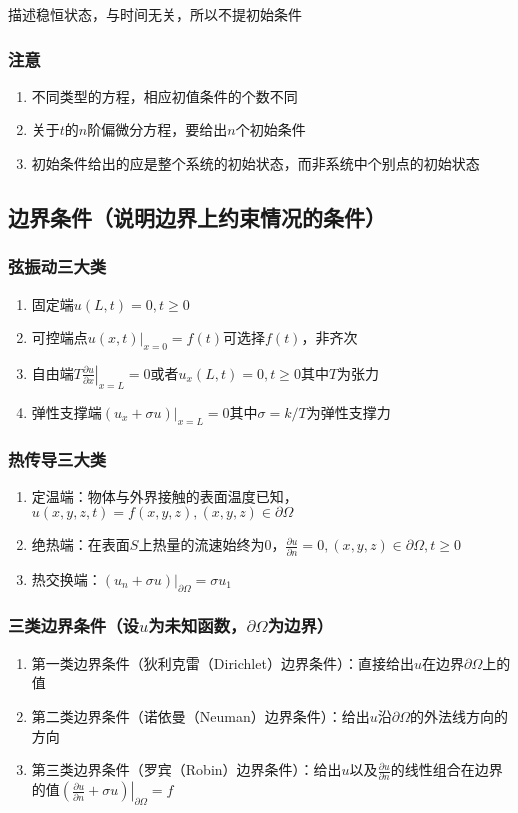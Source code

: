 描述稳恒状态，与时间无关，所以不提初始条件

\subsubsection{注意}
\begin{enumerate}
	\item 不同类型的方程，相应初值条件的个数不同
	\item 关于\(t\)的\(n\)阶偏微分方程，要给出\(n\)个初始条件
	\item 初始条件给出的应是整个系统的初始状态，而非系统中个别点的初始状态
\end{enumerate}

\subsection{边界条件（说明边界上约束情况的条件）}

\subsubsection{弦振动三大类}
\begin{enumerate}
	\item 固定端\(u\left(L,t\right)=0,t\geq0\)
	\item 可控端点\(u(x,t)|_{x=0}=f(t)\)可选择\(f(t)\)，非齐次
	\item 自由端\(T\left.\frac{\partial u}{\partial x}\right|_{x=L}=0\)或者\(u_x\left(L,t\right)=0,t\geq0\)其中\(T\)为张力
	\item 弹性支撑端\((u_x+\sigma u)|_{x=L}=0\)其中\(\sigma=k/T\)为弹性支撑力
\end{enumerate}

\subsubsection{热传导三大类}
\begin{enumerate}
	\item 定温端：物体与外界接触的表面温度已知，\(u(x,y,z,t)=f(x,y,z),(x,y,z)\in\partial\Omega\)
	\item 绝热端：在表面\(S\)上热量的流速始终为0，\(\frac{\partial u}{\partial n}=0,(x,y,z)\in\partial\Omega,t\geq0\)
	\item 热交换端：\((u_n+\sigma u)|_{\partial\Omega}=\sigma u_1\)
\end{enumerate}

\subsubsection{三类边界条件（设\(u\)为未知函数，\(\partial\Omega\)为边界）}
\begin{enumerate}
	\item 第一类边界条件（狄利克雷（Dirichlet）边界条件）：直接给出\(u\)在边界\(\partial\Omega\)上的值
	\item 第二类边界条件（诺依曼（Neuman）边界条件）：给出\(u\)沿\(\partial\Omega\)的外法线方向的方向
	\item 第三类边界条件（罗宾（Robin）边界条件）：给出\(u\)以及\(\frac{\partial u}{\partial n}\)的线性组合在边界的值\(\left.\left(\frac{\partial u}{\partial n}+\sigma u\right)\right|_{\partial\Omega}=f\)
\end{enumerate}
